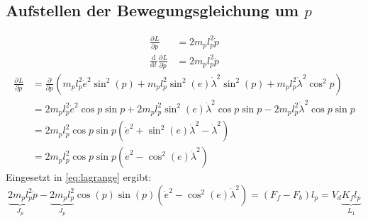 \documentclass{article}
\newcommand{\partiell}[3][]{\frac{\partial^{#1}#2}{\partial{#3}^{#1}}}
\newcommand{\diff}[3][]{\frac{\mathrm{d}^{#1}#2}{\mathrm{d}{#3}^{#1}}}
\begin{document}
	\subsection{Aufstellen der Bewegungsgleichung um $p$}
	\begin{align}
	\partiell{L}{\dot{p}} &= 2m_p l_p^2 \dot{p}\\
	\diff{}{t} \partiell{L}{\dot{p}} &= 2m_p l_p^2 \ddot{p}
	\end{align}
	\begin{equation}
	\begin{split}
	\partiell{L}{p} &= \partiell{}{p} (m_p l_p^2 \dot{e}^2 \sin^2 (p) 
	+ m_p l_p^2 \sin^2 (e) \dot{\lambda}^2 \sin^2 (p)
	+ m_p l_p^2 \dot{\lambda}^2 \cos^2 p)\\
	&= 2 m_p l_p^2 \dot{e}^2 \cos p \sin p + 2 m_p l_p^2 \sin^2 (e) \dot{\lambda}^2 \cos p \sin p 
	- 2 m_p l_p^2 \dot{\lambda}^2 \cos p \sin p\\
	&= 2 m_p l_p^2 \cos p \sin p (\dot{e}^2+ \sin^2 (e) \dot{\lambda}^2- \dot{\lambda}^2)\\
	&= 2 m_p l_p^2 \cos p \sin p (\dot{e}^2- \cos^2 (e) \dot{\lambda}^2)
	\end{split}
	\end{equation}
	Eingesetzt in \eqref{eq:lagrange} ergibt:
	\begin{equation}
	\underbrace{2m_p l_p^2}_{J_p} \ddot{p} -  \underbrace{2 m_p l_p^2}_{J_p} \cos (p) \sin (p) (\dot{e}^2- \cos^2 (e) \dot{\lambda}^2) = (F_f - F_b)l_p = V_d \underbrace{K_f l_p}_{L_1}
	\end{equation}
\end{document}
